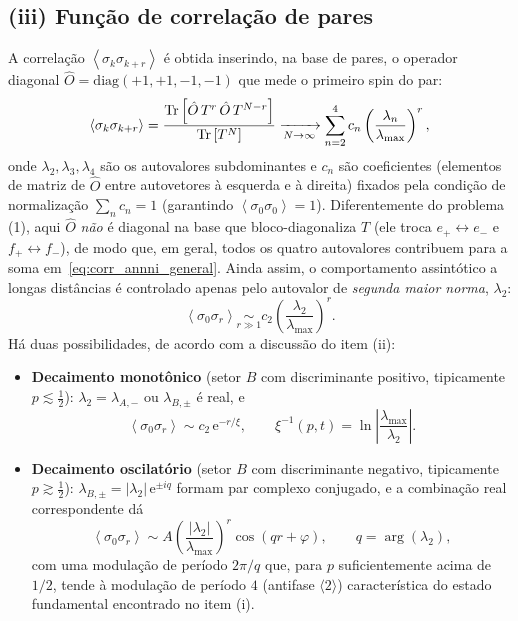 \documentclass[11pt,a4paper]{article}
\newcommand{\e}[1]{\mathrm{e}^{#1}}
\newcommand{\avg}[1]{\left\langle #1\right\rangle}
\begin{document}
\subsection*{(iii) Função de correlação de pares}
%
A correlação $\avg{\sigma_k\sigma_{k+r}}$ é obtida inserindo, na base de pares, o operador diagonal $\hat O=\mathrm{diag}(+1,+1,-1,-1)$ que mede o primeiro spin do par:
%
\begin{equation}
    \avg{\sigma_k\sigma_{k+r}}=\frac{\Tr\left[\hat O\,T^r\,\hat O\,T^{N-r}\right]}{\Tr\left[T^N\right]}
    \xrightarrow[N\to\infty]{}
    \sum_{n=2}^4 c_n\left(\frac{\lambda_n}{\lambda_{\max}}\right)^r,
    \label{eq:corr_annni_general}
\end{equation}
%
onde $\lambda_2,\lambda_3,\lambda_4$ são os autovalores subdominantes e $c_n$ são coeficientes (elementos de matriz de $\hat O$ entre autovetores à esquerda e à direita) fixados pela condição de normalização $\sum_n c_n=1$ (garantindo $\avg{\sigma_0\sigma_0}=1$). Diferentemente do problema (1), aqui $\hat O$ \emph{não} é diagonal na base que bloco-diagonaliza $T$ (ele troca $e_+\leftrightarrow e_-$ e $f_+\leftrightarrow f_-$), de modo que, em geral, todos os quatro autovalores contribuem para a soma em~\eqref{eq:corr_annni_general}. Ainda assim, o comportamento assintótico a longas distâncias é controlado apenas pelo autovalor de \emph{segunda maior norma}, $\lambda_2$:
%
\begin{equation}
    \avg{\sigma_0\sigma_r}\underset{r\gg1}{\sim} c_2\left(\frac{\lambda_2}{\lambda_{\max}}\right)^r.
\end{equation}
%
Há duas possibilidades, de acordo com a discussão do item (ii):
%
\begin{itemize}
    \item \textbf{Decaimento monotônico} (setor $B$ com discriminante positivo, tipicamente $p\lesssim\tfrac12$): $\lambda_2=\lambda_{A,-}$ ou $\lambda_{B,\pm}$ é real, e
    \begin{equation}
        \boxed{
        \avg{\sigma_0\sigma_r}\sim c_2\,\e{-r/\xi},
        \qquad
        \xi^{-1}(p,t)=\ln\left|\frac{\lambda_{\max}}{\lambda_2}\right|.
        }
    \end{equation}
    \item \textbf{Decaimento oscilatório} (setor $B$ com discriminante negativo, tipicamente $p\gtrsim\tfrac12$): $\lambda_{B,\pm}=|\lambda_2|\,\e{\pm iq}$ formam par complexo conjugado, e a combinação real correspondente dá
    \begin{equation}
        \boxed{
        \avg{\sigma_0\sigma_r}\sim A\left(\frac{|\lambda_2|}{\lambda_{\max}}\right)^r\cos(qr+\varphi),
        \qquad
        q=\arg(\lambda_2),
        }
    \end{equation}
    com uma modulação de período $2\pi/q$ que, para $p$ suficientemente acima de $1/2$, tende à modulação de período $4$ (antifase $\langle2\rangle$) característica do estado fundamental encontrado no item (i).
\end{itemize}
\end{document}
